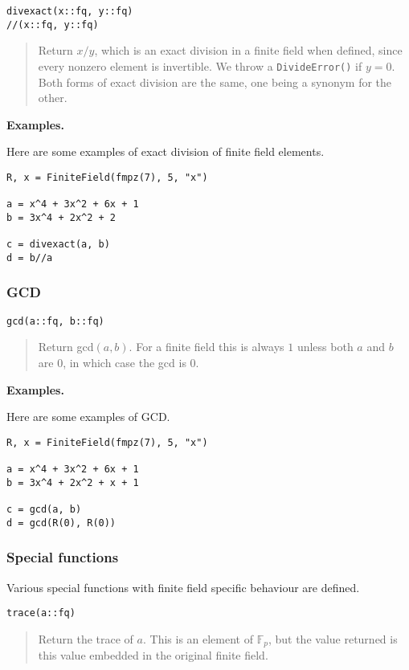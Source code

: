 \documentclass[a4paper,10pt]{article}
\newcommand{\F}{\mathbb{F}}
\newcommand{\code}{\lstinline}
\newcommand{\desc}[1]{\vspace{-3mm}\begin{quote}#1\end{quote}}
\begin{document}
{{\begin{lstlisting}
divexact(x::fq, y::fq)
//(x::fq, y::fq)
\end{lstlisting}

\desc{Return $x/y$, which is an exact division in a finite field when defined,
since every nonzero element is invertible. We throw a \code{DivideError()} if
$y = 0$. Both forms of exact division are the same, one being a synonym for 
the other.}

\textbf{Examples.}

Here are some examples of exact division of finite field elements.

\begin{lstlisting}
R, x = FiniteField(fmpz(7), 5, "x")

a = x^4 + 3x^2 + 6x + 1
b = 3x^4 + 2x^2 + 2

c = divexact(a, b)
d = b//a
\end{lstlisting}

\subsubsection{GCD}

\begin{lstlisting}
gcd(a::fq, b::fq)
\end{lstlisting}

\desc{Return gcd$(a, b)$. For a finite field this is always $1$ unless both
$a$ and $b$ are $0$, in which case the gcd is $0$.}

\textbf{Examples.}

Here are some examples of GCD.

\begin{lstlisting}
R, x = FiniteField(fmpz(7), 5, "x")

a = x^4 + 3x^2 + 6x + 1
b = 3x^4 + 2x^2 + x + 1

c = gcd(a, b)
d = gcd(R(0), R(0))
\end{lstlisting}

\subsubsection{Special functions}

Various special functions with finite field specific behaviour are
defined.

\begin{lstlisting}
trace(a::fq)
\end{lstlisting}

\desc{Return the trace of $a$. This is an element of $\F_p$, but the value
returned is this value embedded in the original finite field.}

}}
\end{document}
